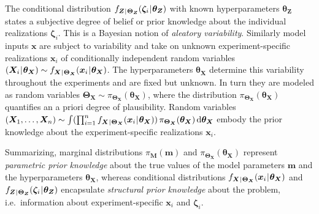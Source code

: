 The conditional distribution \(f_{\bm{Z} {\:\!}|{\:\!} \bm{\Theta}_{\bm{Z}}}(\bm{\zeta}_i {\:\!}|{\:\!} \bm{\theta}_{\bm{Z}})\) with known hyperparameters \(\bm{\theta}_{\bm{Z}}\)
states a subjective degree of belief or prior knowledge about the individual realizations \(\bm{\zeta}_i\).
This is a Bayesian notion of \textit{aleatory variability}.
Similarly model inputs \(\bm{x}\) are subject to variability and take on unknown experiment-specific realizations \(\bm{x}_i\)
of conditionally independent random variables \((\bm{X}_i {\:\!}|{\:\!} \bm{\theta}_{\bm{X}}) \sim f_{\bm{X} {\:\!}|{\:\!} \bm{\Theta}_{\bm{X}}} (\bm{x}_i {\:\!}|{\:\!} \bm{\theta}_{\bm{X}})\).
The hyperparameters \(\bm{\theta}_{\bm{X}}\) determine this variability throughout the experiments and are fixed but unknown.
In turn they are modeled as random variables \(\bm{\Theta}_{\bm{X}} \sim \pi_{\bm{\Theta}_{\bm{X}}} (\bm{\theta}_{\bm{X}})\),
where the distribution \(\pi_{\bm{\Theta}_{\bm{X}}} (\bm{\theta}_{\bm{X}})\) quantifies an a priori degree of plausibility.
Random variables \((\bm{X}_1,\ldots,\bm{X}_n) \sim \int (\prod_{i=1}^n f_{\bm{X} {\:\!}|{\:\!} \bm{\Theta}_{\bm{X}}} (\bm{x}_i {\:\!}|{\:\!} \bm{\theta}_{\bm{X}})) \,
\pi_{\bm{\Theta}_{\bm{X}}} (\bm{\theta}_{\bm{X}}) \, \mathrm{d} \bm{\theta}_{\bm{X}}\) embody the prior knowledge about the experiment-specific realizations \(\bm{x}_i\).
\par %
Summarizing, marginal distributions \(\pi_{\bm{M}} (\bm{m})\) and \(\pi_{\bm{\Theta}_{\bm{X}}} (\bm{\theta}_{\bm{X}})\)
represent \textit{parametric prior knowledge} about the true values of the model parameters \(\bm{m}\) and the hyperparameters \(\bm{\theta}_{\bm{X}}\),
whereas conditional distributions \(f_{\bm{X} {\:\!}|{\:\!} \bm{\Theta}_{\bm{X}}}(\bm{x}_i {\:\!}|{\:\!} \bm{\theta}_{\bm{X}})\) and \(f_{\bm{Z} {\:\!}|{\:\!} \bm{\Theta}_{\bm{Z}}}(\bm{\zeta}_i {\:\!}|{\:\!} \bm{\theta}_{\bm{Z}})\)
encapsulate \textit{structural prior knowledge} about the problem, i.e.\ information about experiment-specific \(\bm{x}_i\) and \(\bm{\zeta}_i\).


